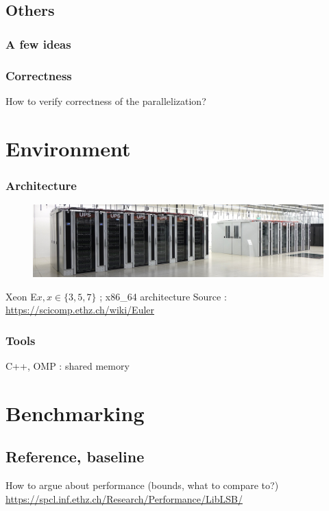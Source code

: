 \documentclass{beamer}
\begin{document}
\subsection{Others}
\begin{frame}
\frametitle{A few ideas}
\end{frame}
\begin{frame}
\frametitle{Correctness}
How to verify correctness of the parallelization?
\end{frame}


\section{Environment}
\begin{frame}
\frametitle{Architecture}
\begin{figure}
\includegraphics[scale=0.4]{EULER.jpg}
\end{figure}


\vspace{.5 cm}

Xeon E$x, x\in\{3, 5, 7\}$ ; x86\_64 architecture
\vfill
{
\tiny
Source : 
\url{https://scicomp.ethz.ch/wiki/Euler}
}
\end{frame}
\begin{frame}
\frametitle{Tools}

C++, OMP : shared memory

\end{frame}


\section{Benchmarking}
\subsection{Reference, baseline}
\begin{frame}
How to argue about performance (bounds, what to compare to?)
\vfill
{
\tiny
\url{https://spcl.inf.ethz.ch/Research/Performance/LibLSB/}
}
\end{frame}
\end{document}
